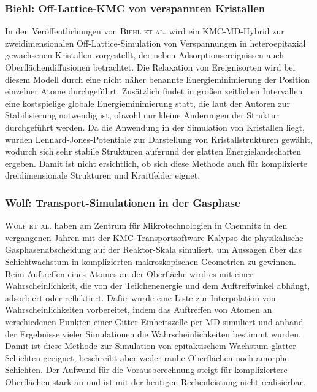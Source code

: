 \subsubsection{Biehl: Off-Lattice-KMC von verspannten Kristallen}
In den Veröffentlichungen von \textsc{Biehl et al.}\cite{biehl_off-lattice_2005} wird ein KMC-MD-Hybrid zur zweidimensionalen Off-Lattice-Simulation von Verspannungen in heteroepitaxial gewachsenen Kristallen vorgestellt, der neben Adsorptionsereignissen auch Oberflächendiffusionen betrachtet.
Die Relaxation von Ereignisorten wird bei diesem Modell durch eine nicht näher benannte Energieminimierung der Position einzelner Atome durchgeführt.
Zusätzlich findet in großen zeitlichen Intervallen eine kostspielige globale Energieminimierung statt, die laut der Autoren zur Stabilisierung notwendig ist, obwohl nur kleine Änderungen der Struktur durchgeführt werden.
Da die Anwendung in der Simulation von Kristallen liegt, wurden Lennard-Jones-Potentiale zur Darstellung von Kristallstrukturen gewählt, wodurch sich sehr stabile Strukturen aufgrund der glatten Energielandschaften ergeben.
Damit ist nicht ersichtlich, ob sich diese Methode auch für komplizierte dreidimensionale Strukturen und Kraftfelder eignet.

\subsubsection{Wolf: Transport-Simulationen in der Gasphase}

\textsc{Wolf et al.}\cite{wolf_investigation_2002,wolf_simulation_2010} haben am Zentrum für Mikrotechnologien in Chemnitz in den vergangenen Jahren mit der KMC-Transportsoftware Kalypso\cite{karolewski_kalypso:_2005} die physikalische Gasphasenabscheidung auf der Reaktor-Skala simuliert, um Aussagen über das Schichtwachstum in komplizierten makroskopischen Geometrien zu gewinnen.
Beim Auftreffen eines Atomes an der Oberfläche wird es mit einer Wahrscheinlichkeit, die von der Teilchenenergie und dem Auftreffwinkel abhängt, adsorbiert oder reflektiert.
Dafür wurde eine Liste zur Interpolation von Wahrscheinlichkeiten vorbereitet, indem das Auftreffen von Atomen an verschiedenen Punkten einer Gitter-Einheitszelle per MD simuliert und anhand der Ergebnisse vieler Simulationen die Wahrscheinlichkeiten bestimmt wurden.
Damit ist diese Methode zur Simulation von epitaktischem Wachstum glatter Schichten geeignet, beschreibt aber weder rauhe Oberflächen noch amorphe Schichten.
Der Aufwand für die Vorausberechnung steigt für kompliziertere Oberflächen stark an und ist mit der heutigen Rechenleistung nicht realisierbar.

